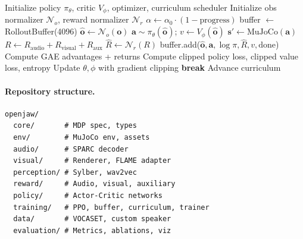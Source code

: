 \documentclass[11pt, a4paper]{article}
\begin{document}
\begin{algorithm}[H]
\caption{OpenJaw PPO Training Loop}
\label{alg:ppo}
\begin{algorithmic}[1]
\STATE Initialize policy $\pi_\theta$, critic $V_\phi$, optimizer, curriculum scheduler
\STATE Initialize obs normalizer $\mathcal{N}_o$, reward normalizer $\mathcal{N}_r$
    \STATE $\alpha \gets \alpha_0 \cdot (1 - \text{progress})$ 
    \STATE buffer $\gets$ RolloutBuffer(4096)
        \STATE $\hat{\mathbf{o}} \gets \mathcal{N}_o(\mathbf{o})$ 
        \STATE $\mathbf{a} \sim \pi_\theta(\hat{\mathbf{o}})$; $v \gets V_\phi(\hat{\mathbf{o}})$
        \STATE $\mathbf{s}' \gets \text{MuJoCo}(\mathbf{a})$
        \STATE $R \gets R_\text{audio} + R_\text{visual} + R_\text{aux}$ 
        \STATE $\hat{R} \gets \mathcal{N}_r(R)$ 
        \STATE buffer.add($\hat{\mathbf{o}}, \mathbf{a}, \log\pi, \hat{R}, v, \text{done}$)
    \ENDWHILE
    \STATE Compute GAE advantages + returns
            \STATE Compute clipped policy loss, clipped value loss, entropy
            \STATE Update $\theta, \phi$ with gradient clipping
        \ENDFOR
            \STATE \textbf{break} 
        \ENDIF
    \ENDFOR
    \STATE Advance curriculum
\ENDWHILE
\end{algorithmic}
\end{algorithm}

\paragraph{Repository structure.}
\begin{verbatim}
openjaw/
  core/       # MDP spec, types
  env/        # MuJoCo env, assets
  audio/      # SPARC decoder
  visual/     # Renderer, FLAME adapter
  perception/ # Sylber, wav2vec
  reward/     # Audio, visual, auxiliary
  policy/     # Actor-Critic networks
  training/   # PPO, buffer, curriculum, trainer
  data/       # VOCASET, custom speaker
  evaluation/ # Metrics, ablations, viz
\end{verbatim}
\end{document}
